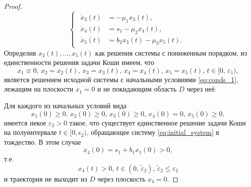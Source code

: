 \documentclass[14pt,a4paper]{extarticle}
\begin{document}
\begin{proof}
\begin{equation*}
\begin{cases}
\begin{aligned}
					\dot{x}_3(t) &= -\mu_1x_3(t),\\
					\dot{x}_4(t) &= s_1 - \mu_2x_4(t),\\
					\dot{x}_5(t) &= b_2x_3(t)-\mu_3x_5(t).
				\end{aligned}
			\end{cases}
		\end{equation*} 
		Определив $x_2(t),\dots,x_5(t)$ как решения системы с пониженным порядком, из единственности решения задачи Коши имеем, что
		\begin{equation*}
		x_1\equiv0,\, x_2=x_2(t),\, x_3=x_3(t),\, x_4=x_4(t),\, x_5=x_5(t),\, t\in[0,\,\varepsilon_1),
		\end{equation*}
		является решением исходной системы с начальными условиями \ref{eq:conds_1}, лежащим на плоскости $x_1=0$ и не покидающим область $D$ через неё.
		
		Для каждого из начальных условий вида
		\begin{equation*}
			x_1(0)\ge0,\, x_2(0)\ge0,\, x_3(0)\ge0,\, x_4(0)=0,\, x_5(0)\ge0,
		\end{equation*}
		имеется некое $\varepsilon_2>0$ такое, что существует единственное решение задачи Коши на полуинтервале $t\in[0,\epsilon_2)$, обращающее систему \ref{eq:initial_system} в тождество. В этом случае 
		\[\dot{x}_4(0)=s_1+b_1x_1(0)>0,\]
		т.е. 
		\[x_4(t)>0,\, t\in(0,\, \tilde{\varepsilon}_2),\,\tilde{\varepsilon}_2\le\varepsilon_2\]
		и траектория не выходит из $D$ через плоскость $x_4=0$.
		

\end{proof}
\end{document}
